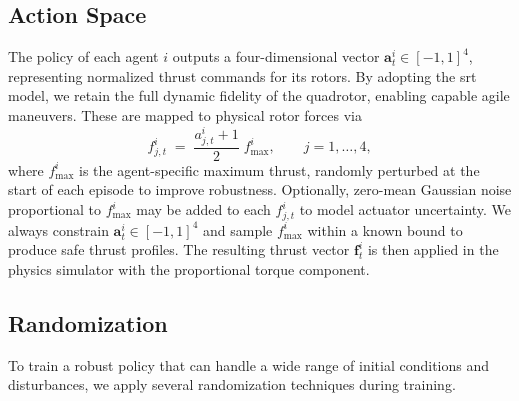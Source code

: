 \subsection{Action Space}
The policy of each agent \(i\) outputs a four-dimensional vector \(\mathbf{a}^i_t\in[-1,1]^4\), representing normalized thrust commands for its rotors. By adopting the \gls{srt} model, we retain the full dynamic fidelity of the quadrotor, enabling capable agile maneuvers.
 These are mapped to physical rotor forces via
\begin{equation}
f^i_{j,t}
\;=\;
\frac{a^i_{j,t} + 1}{2}\;f_{\max}^i,
\qquad
j=1,\dots,4,
\end{equation}
where \(f_{\max}^i\) is the agent-specific maximum thrust, randomly perturbed at the start of each episode to improve robustness. Optionally, zero-mean Gaussian noise proportional to \(f_{\max}^i\) may be added to each \(f^i_{j,t}\) to model actuator uncertainty. We always constrain \(\mathbf{a}^i_t\in[-1,1]^4\) and sample \(f_{\max}^i\) within a known bound to produce safe thrust profiles. The resulting thrust vector \(\mathbf{f}^i_t\) is then applied in the physics simulator with the proportional torque component.
\subsection{Randomization}
To train a robust policy that can handle a wide range of initial conditions and disturbances, we apply several randomization techniques during training.
